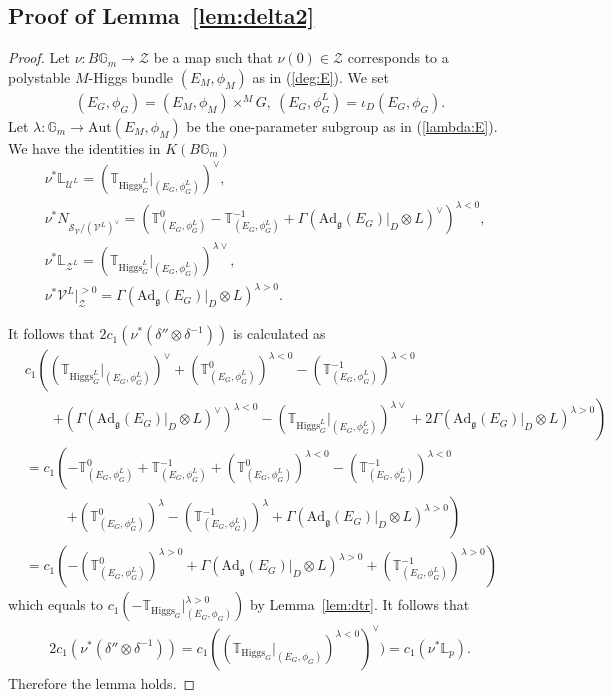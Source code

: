 \documentclass [11pt,oneside,a4paper,mathscr]{amsart}
\theoremstyle{definition}
\newcommand{\zZ}{\mathcal{Z}}
\newcommand{\V}{\mathcal{V}}
\newcommand{\bgm}{B\mathbb{G}_m}
\newcommand{\fg}{\mathfrak{g}}
\newcommand{\Ad}{\mathrm{Ad}}
\newcommand{\Hig}{\mathrm{Higgs}}
\begin{document}
\subsection{Proof of Lemma~\ref{lem:delta2}}\label{subsec:pfdelta}
\begin{proof}
Let $\nu \colon \bgm \to \zZ$ be a map 
such that $\nu(0)\in \zZ$ corresponds to 
a polystable $M$-Higgs bundle $(E_M, \phi_M)$ as in (\ref{deg:E}). 
We set
\begin{align*}(E_G, \phi_G)=(E_M, \phi_M)\times^M G, \ (E_G, \phi_G^{L})=\iota_D(E_G, \phi_G).
\end{align*}
Let $\lambda \colon \mathbb{G}_m \to \mathrm{Aut}(E_M, \phi_M)$ 
be the one-parameter subgroup as in (\ref{lambda:E}). 
We have the identities in $K(\bgm)$
\begin{align*}
    &\nu^* \mathbb{L}_{\mathcal{U}^L}=(\mathbb{T}_{\Hig_G^{L}}|_{(E_G, \phi_G^{L})})^{\vee}, \\
    &\nu^* N_{\mathcal{S}_{\V}/(\V^L)^{\vee}}=(\mathbb{T}^0_{(E_G, \phi_G^{L})} -\mathbb{T}^{-1}_{(E_G, \phi_G^{L})}
    +\Gamma(\Ad_{\fg}(E_G)|_{D}\otimes L)^{\vee})^{\lambda<0}, \\
    &\nu^* \mathbb{L}_{\zZ^L}=(\mathbb{T}_{\Hig_G^{L}}|_{(E_G, \phi_G^{L})})^{\lambda\vee}, \\
    &\nu^* \V^L|_{\zZ}^{>0}=\Gamma(\Ad_{\fg}(E_G)|_{D}\otimes L)^{\lambda>0}.
\end{align*}

It follows that $2c_1(\nu^*(\delta'' \otimes \delta^{-1}))$ is calculated as 
\begin{align*}
    &c_1\left((\mathbb{T}_{\Hig_G^{L}}|_{(E_G, \phi_G^{L})})^{\vee}
    +(\mathbb{T}^0_{(E_G, \phi_G^{L})})^{\lambda<0} -(\mathbb{T}^{-1}_{(E_G, \phi_G^{L})})^{\lambda<0} \right. \\
    &\quad \quad\left.+(\Gamma(\Ad_{\fg}(E_G)|_{D}\otimes L)^{\vee})^{\lambda<0} -(\mathbb{T}_{\Hig_G^{L}}|_{(E_G, \phi_G^{L})})^{\lambda\vee}+2\Gamma(\Ad_{\fg}(E_G)|_{D}\otimes L)^{\lambda>0} \right) \\
    &=c_1\left(-\mathbb{T}^0_{(E_G, \phi_G^{L})}+\mathbb{T}^{-1}_{(E_G, \phi_G^{L})}+(\mathbb{T}^0_{(E_G, \phi_G^{L})})^{\lambda<0} 
    -(\mathbb{T}^{-1}_{(E_G, \phi_G^{L})})^{\lambda<0}\right.\\
    &\quad \qquad\left.+(\mathbb{T}^0_{(E_G, \phi_G^{L})})^{\lambda} -(\mathbb{T}^{-1}_{(E_G, \phi_G^{L})})^{\lambda}
    +\Gamma(\Ad_{\fg}(E_G)|_{D}\otimes L)^{\lambda>0} \right)\\
    &=c_1\left(-(\mathbb{T}^0_{(E_G, \phi_G^{L})})^{\lambda>0}+\Gamma(\Ad_{\fg}(E_G)|_{D}\otimes L)^{\lambda>0}+(\mathbb{T}^{-1}_{(E_G, \phi_G^{L})})^{\lambda>0}\right)
\end{align*}
which equals to $c_1(-\mathbb{T}_{\Hig_G}|_{(E_G, \phi_G)}^{\lambda>0})$ by Lemma~\ref{lem:dtr}. 
It follows that 
\begin{align*}
    2c_1(\nu^*(\delta''\otimes \delta^{-1}))=c_1((\mathbb{T}_{\Hig_G}|_{(E_G, \phi_G)})^{\lambda<0})^{\vee})=c_1(\nu^*\mathbb{L}_{p}).
\end{align*}
Therefore the lemma holds. 
	\end{proof}
\end{document}
